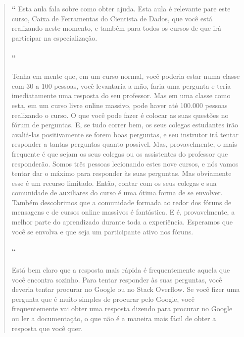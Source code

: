 \begin{quotation}%
\begin{small}
{\large\textbf{``}}%
Esta aula fala sobre como obter ajuda. Esta aula é relevante pare este curso, Caixa de Ferramentas do Cientista de Dados, que você está realizando neste momento,  e também para todos os cursos de que irá participar na especialização.

\paragraph{``}
Tenha em mente que, em um curso normal, você poderia estar numa classe  com 30 a 100 pessoas, você levantaria a mão, faria uma pergunta  e teria imediatamente uma resposta do seu professor. Mas em uma classe como esta, em um curso livre online massivo, pode haver até 100.000 pessoas realizando o curso. O que você pode fazer é colocar as suas questões no fórum de perguntas.  E, se tudo correr bem, os seus colegas estudantes irão avaliá-las positivamente se forem boas perguntas, e seu instrutor irá tentar responder a tantas perguntas quanto possível. Mas, provavelmente, o mais frequente é que sejam os seus colegas ou os assistentes do professor que responderão. Somos três pessoas lecionando estes nove cursos, e nós vamos tentar dar o máximo para responder às suas perguntas. Mas obviamente esse é um recurso limitado. Então, contar com os seus colegas e sua comunidade de auxiliares do curso é uma ótima forma de se envolver. Também descobrimos que a comunidade formada  ao redor dos fóruns de mensagens e de cursos online massivos é fantástica. E é, provavelmente, a melhor parte do aprendizado durante toda a experiência. Esperamos que você se envolva  e que seja um participante ativo nos fóruns.

\paragraph{``}
Está bem claro que a resposta mais rápida é frequentemente aquela que você encontra sozinho. Para tentar responder às suas perguntas, você deveria tentar procurar no Google ou no Stack Overflow. Se você fizer uma pergunta que é muito simples de procurar pelo Google, você frequentemente vai obter uma resposta dizendo para procurar no Google ou ler a documentação, o que não é a maneira mais fácil de obter a resposta que você quer.


\end{small}
\end{quotation}
